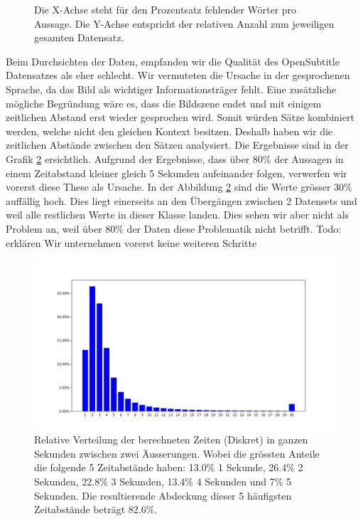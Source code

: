 \begin{figure}[!htb]
	\centering
	\small
	\endminipage
	\caption{Die X-Achse steht für den Prozentsatz fehlender Wörter pro Aussage. Die Y-Achse entspricht der relativen Anzahl zum jeweiligen gesamten Datensatz.}
	\label{fig:data:reddit:vocab:analyze}
\end{figure}

Beim Durchsichten der Daten, empfanden wir die Qualität des OpenSubtitle Datensatzes als eher schlecht. Wir vermuteten die Ursache in der gesprochenen Sprache, da das Bild als wichtiger Informationsträger fehlt. Eine zusätzliche mögliche Begründung wäre es, dass die Bildszene endet und mit einigem zeitlichen Abstand erst wieder gesprochen wird. Somit würden Sätze kombiniert werden, welche nicht den gleichen Kontext besitzen. Deshalb haben wir die zeitlichen Abstände zwischen den Sätzen analysiert. Die Ergebnisse sind in der Grafik \ref{fig:data:analyse:timediff:opus} ersichtlich. Aufgrund der Ergebnisse, dass über 80\% der Aussagen in einem Zeitabstand kleiner gleich 5 Sekunden aufeinander folgen, verwerfen wir vorerst diese These als Ursache. In der Abbildung \ref{fig:data:analyse:timediff:opus} sind die Werte grösser 30\% auffällig hoch. Dies liegt einerseits an den Übergängen zwischen 2 Datensets und weil alle restlichen Werte in dieser Klasse landen. Dies sehen wir aber nicht als Problem an, weil über 80\% der Daten diese Problematik nicht betrifft.
Todo: erklären Wir unternehmen vorerst keine weiteren Schritte

\begin{figure}[h]
	\centering
	\includegraphics[width=15cm]{img/opus_time_analyze.PNG}
	\caption{Relative Verteilung der berechneten Zeiten (Diskret) in ganzen Sekunden zwischen zwei Äusserungen. Wobei die grössten Anteile die folgende 5 Zeitabstände haben: 13.0\% 1 Sekunde, 26.4\% 2 Sekunden, 22.8\% 3 Sekunden, 13.4\% 4 Sekunden und 7\% 5 Sekunden. Die resultierende Abdeckung dieser 5 häufigsten Zeitabstände beträgt 82.6\%.}
	\label{fig:data:analyse:timediff:opus}
\end{figure}


